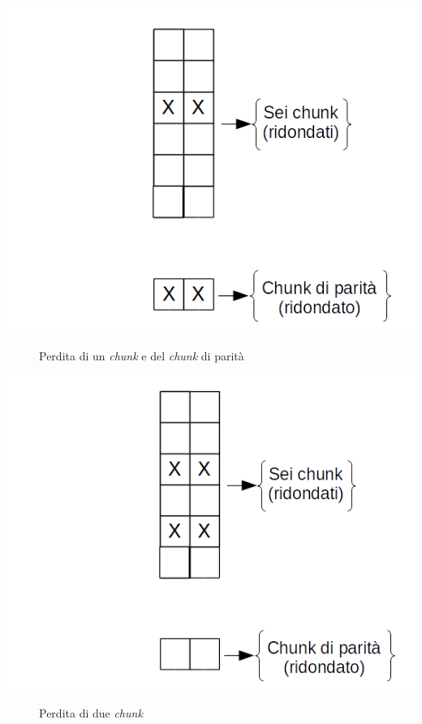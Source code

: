 \begin{center}
\includegraphics[scale=0.55]{img/chunk2.png}
\end{center}
\begin{figure}[htbp]
\caption{Perdita di un \textit{chunk} e del \textit{chunk} di parit\`{a} \label{figura1.29}}
\end{figure}

\begin{center}
\includegraphics[scale=0.55]{img/chunk3.png}
\end{center}
\begin{figure}[htbp]
\caption{Perdita di due \textit{chunk} \label{figura1.30}}
\end{figure}


